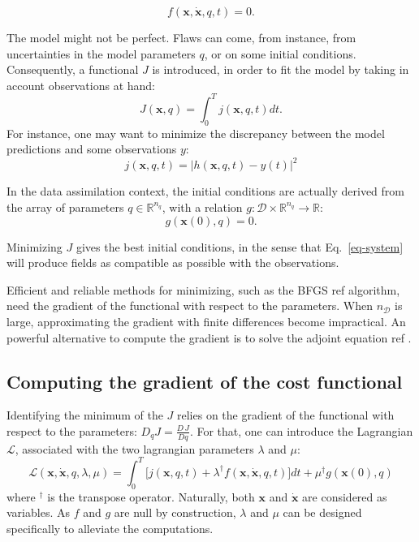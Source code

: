 \documentclass[aip,pof,nofootinbib,reprint,onecolumn]{revtex4-1}
\newcommand{\todo}[1]{{\color{red} #1 }}
\newcommand{\gras}[1]{\boldsymbol{#1}}
\newcommand{\mypar}[1]{\left(#1\right)}
\newcommand{\Ephaz}{\mathcal{D}}%
\newcommand{\Nphaz}{n_{\mathcal{D}}} %
\newcommand{\fdyn}{f} %
\newcommand{\costf}{J} %
\newcommand{\costff}{j} %
\newcommand{\lag}{\mathcal{L}} %
\newcommand{\obs}{y} %
\newcommand{\point}{\gras{x}} %
\begin{document}
\begin{equation}
\fdyn(\point,\dot{\point},q,t) =0.
\label{eq-system}
\end{equation} 

The model might not be perfect. Flaws can come, from instance, from uncertainties in the model parameters $q$, or on some initial conditions.
Consequently, a functional $\costf$ is introduced, in order to fit the model by taking in account observations at hand:
\begin{equation}
\costf(\point,q) = \int_0^T  \costff(\point,q,t) dt.
\label{eq-def_cost}
\end{equation} 
For instance, one may want to minimize the discrepancy between the model predictions and some observations $\obs$:
$$\costff(\point,q,t) = \left|h(\point,q,t) - \obs(t)\right|^2$$ 

In the data assimilation context, the initial conditions are actually derived from the array of parameters $q\in\mathbb{R}^{n_q}$, with a relation $g:\Ephaz\times\mathbb{R}^{n_q}\rightarrow\mathbb{R}$:
$$g(\point(0),q) = 0.$$

Minimizing $\costf$ gives the best initial conditions, in the sense that Eq.~\eqref{eq-system} will produce fields as compatible as possible with the observations.

Efficient and reliable methods for minimizing, such as the BFGS\todo{ref} algorithm, need the gradient of the functional with respect to the parameters. When $\Nphaz$ is large, approximating the gradient with finite differences become impractical. An powerful alternative to compute the gradient is to solve the adjoint equation\todo{ref}.
\subsection{Computing the gradient of the cost functional}

Identifying the minimum of the $\costf$ relies on the gradient of the functional with respect to the parameters: $D_q\costf = \frac{D\,\costf}{Dq}$.
For that, one can introduce the Lagrangian $\lag$, associated with the two lagrangian parameters $\lambda$ and $\mu$:
\begin{equation} \lag\mypar{\point,\dot{\point},q,\lambda,\mu} = \int_0^T  \bigg[\costff(\point,q,t) + \lambda^{\dagger}\fdyn(\point,\dot{\point},q,t) \bigg] dt + \mu^{\dagger} g(\point(0),q) 
\label{eq-lag}
\end{equation}
where $^{\dagger}$ is the transpose operator. Naturally, both $\point$ and $\dot{\point}$ are considered as variables.
As $\fdyn$ and $g$ are null by construction, $\lambda$ and $\mu$ can be designed specifically to alleviate the computations.
\end{document}
